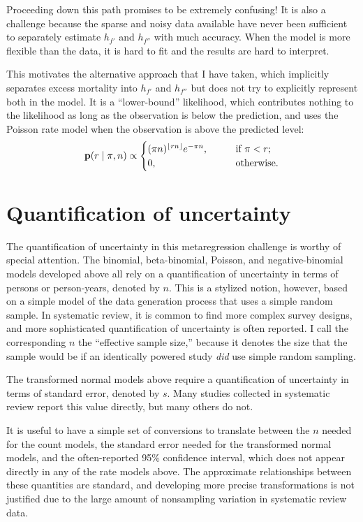 Proceeding down this path promises to be extremely confusing!  It is
also a challenge because the sparse and noisy data available have
never been sufficient to separately estimate $h_{f'}$ and $h_{f''}$ with much
accuracy.  When the model is more flexible than the data, it is hard
to fit and the results are hard to interpret.

This motivates the alternative approach that I have taken, which
implicitly separates excess mortality into $h_{f'}$ and $h_{f''}$ but does
not try to explicitly represent both in the model.  It is a
``lower-bound'' likelihood, which contributes nothing to the likelihood as
long as the observation is below the prediction, and uses the Poisson
rate model when the observation is above the predicted level:
\[
\mathbf{p}(r \;|\; \pi,n) \propto
\begin{cases}
(\pi n)^{\lfloor rn\rfloor} e^{-\pi n}, &\qquad\text{if } \pi < r;\\
  0, &\qquad\text{otherwise.}
\end{cases}
\]

\section{Quantification of uncertainty}
The quantification of uncertainty in this metaregression challenge is
worthy of special attention.  The binomial, beta-binomial, Poisson,
and negative-binomial models developed above all rely on a
quantification of uncertainty in terms of persons or person-years,
denoted by $n$.  This is a stylized notion, however, based on a simple
model of the data generation process that uses a simple random sample.
In systematic review, it is common to find more complex survey
designs, and more sophisticated quantification of uncertainty is often
reported.  I call the corresponding $n$ the ``effective sample size,''
because it denotes the size that the sample would be if an identically
powered study \emph{did} use simple random sampling.

The transformed normal models above require a quantification of
uncertainty in terms of standard error, denoted by $s$.  Many studies
collected in systematic review report this value directly, but many
others do not.

It is useful to have a simple set of conversions to translate between
the $n$ needed for the count models, the standard error needed for the
transformed normal models, and the often-reported 95\% confidence
interval, which does not appear directly in any of the rate models
above. The approximate relationships between these quantities are
standard, and developing more precise transformations is not justified
due to the large amount of nonsampling variation in systematic review
data.

